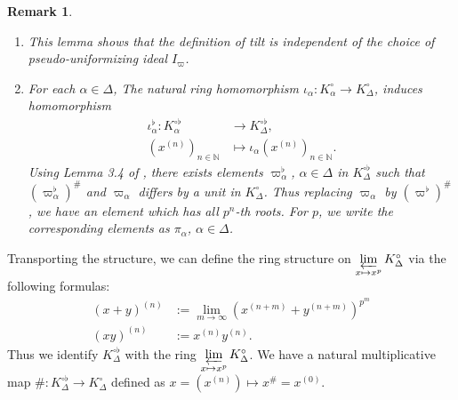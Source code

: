 \documentclass[12pts,a4paper]{amsart}
\newtheorem{remark}[proposition]{Remark}
\begin{document}
\begin{remark}
   \begin{enumerate}
       \item[(i)] This lemma shows that the definition of tilt is independent of the choice of pseudo-uniformizing ideal $I_\varpi$.

       \item[(ii)] For each $\alpha\in\Delta$, The natural ring homomorphism $\iota_\alpha: K^\circ_\alpha\to K^\circ_\Delta$, induces homomorphism 
       \begin{align*}
           \iota^\flat_\alpha: K^{\circ\flat}_\alpha&\to K^{\circ\flat}_\Delta,\\
                        (x^{(n)})_{n\in\mathbb{N}}  &\mapsto \iota_\alpha(x^{(n)})_{n\in\mathbb{N}}.
       \end{align*}
       Using Lemma 3.4 of \cite{Sch}, there exists elements $\varpi^\flat_\alpha$, $\alpha\in\Delta$ in $K^{\circ\flat}_\Delta$ such that $(\varpi^\flat_\alpha)^\#$ and $\varpi_\alpha$ differs by a unit in $K^\circ_\Delta$. Thus replacing $\varpi_\alpha$ by $(\varpi^\flat)^\#$, we have an element which has all $p^n$-th roots. For $p$, we write the corresponding elements as $\pi_\alpha$, $\alpha\in\Delta$.
   \end{enumerate}
    
\end{remark}

Transporting the structure, we can define the ring structure on $\varprojlim\limits_{x\mapsto x^p}K^\circ_\Delta$ via the following formulas:
\begin{align*}
	(x+y)^{(n)}&:=\lim\limits_{m\to\infty}(x^{(n+m)}+y^{(n+m)})^{p^m}\\
	  (xy)^{(n)}&:=x^{(n)}y^{(n)} .
\end{align*}
Thus we identify $K^{\circ\flat}_\Delta$ with the ring $\varprojlim\limits_{x\mapsto x^p}K^\circ_\Delta$. We have a natural multiplicative map $\#:K^{\circ\flat}_\Delta\to K^\circ_\Delta$ defined as $x=(x^{(n)})\mapsto x^\#=x^{(0)}$.
\end{document}
